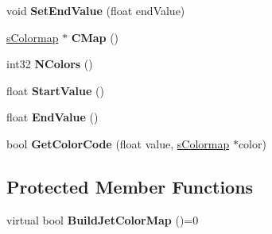 \begin{DoxyCompactItemize}
\item 
\hypertarget{classColormapInterface_a881042c149d035141b8a6a665fa23118}{
void {\bfseries SetEndValue} (float endValue)}
\label{classColormapInterface_a881042c149d035141b8a6a665fa23118}

\item 
\hypertarget{classColormapInterface_aee7a172a11995765c9ac099769b4616b}{
\hyperlink{structsColormap}{sColormap} $\ast$ {\bfseries CMap} ()}
\label{classColormapInterface_aee7a172a11995765c9ac099769b4616b}

\item 
\hypertarget{classColormapInterface_a6d7bce43dd54507ad5afeb08893d882e}{
int32 {\bfseries NColors} ()}
\label{classColormapInterface_a6d7bce43dd54507ad5afeb08893d882e}

\item 
\hypertarget{classColormapInterface_a3ff1b9f35c8100cf5eb371a5ccb226b4}{
float {\bfseries StartValue} ()}
\label{classColormapInterface_a3ff1b9f35c8100cf5eb371a5ccb226b4}

\item 
\hypertarget{classColormapInterface_a6a154f895822ddf3b8b3dfcb60ee3650}{
float {\bfseries EndValue} ()}
\label{classColormapInterface_a6a154f895822ddf3b8b3dfcb60ee3650}

\item 
\hypertarget{classColormapInterface_ac004257f5873631c251a07a73751642a}{
bool {\bfseries GetColorCode} (float value, \hyperlink{structsColormap}{sColormap} $\ast$color)}
\label{classColormapInterface_ac004257f5873631c251a07a73751642a}

\end{DoxyCompactItemize}
\subsection*{Protected Member Functions}
\begin{DoxyCompactItemize}
\item 
\hypertarget{classColormapInterface_a6a21ed77cc32412d0888843ab5a72ab5}{
virtual bool {\bfseries BuildJetColorMap} ()=0}
\label{classColormapInterface_a6a21ed77cc32412d0888843ab5a72ab5}

\end{DoxyCompactItemize}
